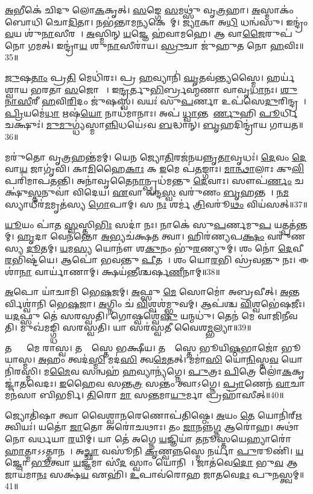 \ul{𑌅}𑌭𑍀𑌕𑍇॑ 𑌚𑌿𑌦𑍁 𑌲𑍋\ul{𑌕}𑌕𑍃𑌤𑍍।
\ul{𑌸}𑌙𑍍𑌗𑍇 \ul{𑌸}𑌮𑌥𑍍𑌸𑍁॑ 𑌵𑍃\ul{𑌤𑍍𑌰}𑌹𑌾।
\ul{𑌅}𑌸𑍍𑌮𑌾𑌕𑌂॑ 𑌬𑍋𑌧𑌿 𑌚𑍋\ul{𑌦𑌿}𑌤𑌾।
𑌨𑌭॑𑌨𑍍𑌤𑌾𑌮\ul{𑌨𑍍𑌯}𑌕𑍇𑌷𑌾᳚𑌮𑍍।
\ul{𑌜𑍍𑌯𑌾}𑌕𑌾 𑌅\ul{𑌧𑌿} 𑌧𑌨𑍍𑌵॑𑌸𑍁।
𑌇𑌨𑍍𑌦𑍍𑌰𑌂॑ \ul{𑌵}𑌯 𑌶𑍁॑\ul{𑌨𑌾}𑌸𑍀𑌰𑌮𑍍᳚।
\ul{𑌅}𑌸𑍍𑌮𑌿𑌨𑍍 \ul{𑌯}𑌜𑍍𑌞𑍇 𑌹॑𑌵𑌾𑌮𑌹𑍇।
𑌆 𑌵𑌾\ul{𑌜𑍈}𑌰𑍁𑌪॑ 𑌨𑍋 𑌗𑌮𑌤𑍍।
𑌇𑌨𑍍𑌦𑍍𑌰𑌾॑\ul{𑌯} 𑌶𑍁\ul{𑌨𑌾}𑌸𑍀𑌰𑌾॑𑌯।
\ul{𑌸𑍍𑌰𑍁}𑌚𑌾 𑌜𑍁॑𑌹𑍁𑌤 𑌨𑍋 \ul{𑌹}𑌵𑌿𑌃॥35॥

\ul{𑌜𑍁}𑌷\ul{𑌤𑌾𑌂} 𑌪𑍍𑌰\ul{𑌤𑌿} 𑌮𑍇𑌧𑌿॑𑌰𑌃।
𑌪𑍍𑌰 \ul{𑌹}𑌵𑍍𑌯𑌾𑌨𑌿॑ \ul{𑌘𑍃}𑌤𑌵॑𑌨𑍍𑌤𑍍𑌯𑌸𑍍𑌮𑍈।
𑌹𑌰𑍍𑌯॑𑌶𑍍𑌵𑌾𑌯 𑌭𑌰𑌤𑌾 \ul{𑌸}𑌜𑍋𑌷𑌾𑌃᳚।
𑌇\ul{𑌨𑍍𑌦𑍍𑌰}𑌰𑍍𑌤𑍁\ul{𑌭𑌿}𑌰𑍍𑌬𑍍𑌰𑌹𑍍𑌮॑𑌣𑌾 𑌵𑌾𑌵𑍃\ul{𑌧𑌾}𑌨𑌃।
\ul{𑌶𑍁}\ul{𑌨𑌾}\ul{𑌸𑍀}𑌰𑍀 \ul{𑌹}𑌵𑌿\ul{𑌰𑌿}𑌦𑌂 𑌜𑍁॑𑌷𑌸𑍍𑌵।
𑌵𑌯𑌃॑ 𑌸𑍁\ul{𑌪}𑌰𑍍𑌣𑌾 𑌉𑌪॑𑌸𑍇\ul{𑌦𑍁}𑌰𑌿𑌨𑍍𑌦𑍍𑌰𑌮𑍍᳚।
\ul{𑌪𑍍𑌰𑌿}𑌯𑌮𑍇॑\ul{𑌧𑌾} 𑌋𑌷॑\ul{𑌯𑍋} 𑌨𑌾𑌧॑𑌮𑌾𑌨𑌾𑌃।
𑌅𑌪॑ \ul{𑌧𑍍𑌵𑌾}𑌨𑍍𑌤𑌮𑍂᳚\ul{𑌰𑍍𑌣𑍁}𑌹𑌿 \ul{𑌪𑍂}𑌰𑍍𑌧𑌿 𑌚𑌕𑍍𑌷𑍁𑌃॑।
\ul{𑌮𑍁}\ul{𑌮𑍁}𑌗𑍍𑌧𑍍𑌯॑𑌸𑍍𑌮𑌾\ul{𑌨𑍍𑌨𑌿}𑌧𑌯𑍇॑𑌽𑌵 \ul{𑌬}𑌦𑍍𑌧𑌾𑌨𑍍।
\ul{𑌬𑍃}𑌹𑌦𑌿𑌨𑍍𑌦𑍍𑌰𑌾॑𑌯 𑌗𑌾𑌯𑌤॥36॥

𑌮𑌰𑍁॑𑌤𑍋 𑌵𑍃\ul{𑌤𑍍𑌰}𑌹𑌨𑍍𑌤॑𑌮𑌮𑍍।
𑌯𑍇\ul{𑌨} 𑌜𑍍𑌯𑍋\ul{𑌤𑌿}𑌰𑌜॑𑌨𑌯𑌨𑍍𑌨𑍃\ul{𑌤𑌾}𑌵𑍃𑌧𑌃॑।
\ul{𑌦𑍇}𑌵𑌂 \ul{𑌦𑍇}𑌵𑌾\ul{𑌯} 𑌜𑌾𑌗𑍃॑𑌵𑌿।
𑌕𑌾\ul{𑌮𑌿}𑌹𑍈\ul{𑌕𑌾𑌃} 𑌕 \ul{𑌇}𑌮𑍇 𑌪॑\ul{𑌤}𑌙𑍍𑌗𑌾𑌃।
\ul{𑌮𑌾}\ul{𑌨𑍍𑌥𑌾}𑌲𑌾𑌃 𑌕𑍁\ul{𑌲𑌿}𑌪𑌰𑌿॑𑌮𑌾𑌪𑌤𑌨𑍍𑌤𑌿।
𑌅𑌨𑌾॑𑌵𑍃𑌤𑍈\ul{𑌨𑌾}𑌨𑍍𑌪𑍍𑌰𑌧॑𑌮𑌨𑍍𑌤𑍁 \ul{𑌦𑍇}𑌵𑌾𑌃।
𑌸𑍗𑌪॑\ul{𑌰𑍍𑌣𑌂} 𑌚𑌕𑍍𑌷𑍁॑\ul{𑌸𑍍𑌤}𑌨𑍁𑌵𑌾॑ 𑌵𑌿𑌦𑍇𑌯।
\ul{𑌏}𑌵𑌾 𑌵॑𑌨𑍍𑌦\ul{𑌸𑍍𑌵} 𑌵𑌰𑍁॑𑌣𑌂 \ul{𑌬𑍃}𑌹𑌨𑍍𑌤𑌮𑍍᳚।
\ul{𑌨}\ul{𑌮}𑌸𑍍𑌯𑌾𑌧𑍀𑌰॑\ul{𑌮}𑌮𑍃𑌤॑𑌸𑍍𑌯 \ul{𑌗𑍋}𑌪𑌾𑌮𑍍।
𑌸 \ul{𑌨𑌃} 𑌶𑌰𑍍𑌮॑ \ul{𑌤𑍍𑌰𑌿}𑌵𑌰𑍂॑\ul{𑌥𑌂} 𑌵𑌿𑌯॑𑌸𑌤𑍍॥37॥

\ul{𑌯𑍂}𑌯𑌂 𑌪𑌾॑𑌤 \ul{𑌸𑍍𑌵}𑌸𑍍𑌤𑌿\ul{𑌭𑌿𑌃} 𑌸𑌦𑌾॑ 𑌨𑌃।
𑌨𑌾𑌕𑍇॑ 𑌸𑍁\ul{𑌪}𑌰𑍍𑌣𑌮𑍁\ul{𑌪} 𑌯𑌤𑍍𑌪𑌤॑𑌨𑍍𑌤𑌮𑍍।
\ul{𑌹𑍃}𑌦𑌾 𑌵𑍇𑌨॑𑌨𑍍𑌤𑍋 \ul{𑌅}𑌭𑍍𑌯𑌚॑𑌕𑍍𑌷𑌤 𑌤𑍍𑌵𑌾।
𑌹𑌿𑌰॑𑌣𑍍𑌯𑌪\ul{𑌕𑍍𑌷𑌂} 𑌵𑌰𑍁॑𑌣𑌸𑍍𑌯 \ul{𑌦𑍂}𑌤𑌮𑍍।
\ul{𑌯}𑌮\ul{𑌸𑍍𑌯} 𑌯𑍋𑌨𑍗॑ 𑌶\ul{𑌕𑍁}𑌨𑌂 𑌭𑍁॑\ul{𑌰}𑌣𑍍𑌯𑍁𑌮𑍍।
𑌶𑌂 𑌨𑍋॑ \ul{𑌦𑍇}𑌵𑍀\ul{𑌰}𑌭𑌿𑌷𑍍𑌟॑𑌯𑍇।
𑌆𑌪𑍋॑ 𑌭𑌵𑌨𑍍𑌤𑍁 \ul{𑌪𑍀}𑌤𑌯𑍇᳚।
𑌶𑌂 𑌯𑍋\ul{𑌰}𑌭𑌿 𑌸𑍍𑌰॑𑌵𑌨𑍍𑌤𑍁 𑌨𑌃।
𑌈𑌶𑌾॑\ul{𑌨𑌾} 𑌵𑌾𑌰𑍍𑌯𑌾॑𑌣𑌾𑌮𑍍।
𑌕𑍍𑌷𑌯॑𑌨𑍍𑌤𑍀𑌶𑍍𑌚𑌰𑍍\mbox{}𑌷\ul{𑌣𑍀}𑌨𑌾𑌮𑍍॥38॥

\ul{𑌅}𑌪𑍋 𑌯𑌾॑𑌚𑌾𑌮𑌿 𑌭𑍇\ul{𑌷}𑌜𑌮𑍍।
\ul{𑌅}𑌫𑍍𑌸𑍁 \ul{𑌮𑍇} 𑌸𑍋𑌮𑍋॑ 𑌅𑌬𑍍𑌰𑌵𑍀𑌤𑍍।
\ul{𑌅}𑌨𑍍𑌤𑌰𑍍𑌵𑌿𑌶𑍍𑌵𑌾॑𑌨𑌿 𑌭𑍇\ul{𑌷}𑌜𑌾।
\ul{𑌅}𑌗𑍍𑌨𑌿𑌂 𑌚॑ \ul{𑌵𑌿}𑌶𑍍𑌵𑌶॑𑌮𑍍𑌭𑍁𑌵𑌮𑍍।
𑌆𑌪॑𑌶𑍍𑌚 \ul{𑌵𑌿}𑌶𑍍𑌵𑌭𑍇॑𑌷𑌜𑍀𑌃।
𑌯\ul{𑌦}𑌫𑍍𑌸𑍁 𑌤𑍇॑ 𑌸𑌰𑌸𑍍𑌵𑌤𑌿।
𑌗𑍋𑌷𑍍𑌵𑌶𑍍𑌵𑍇॑\ul{𑌷𑍁} 𑌯𑌨𑍍𑌮𑌧𑍁॑।
𑌤𑍇𑌨॑ 𑌮𑍇 𑌵𑌾𑌜𑌿𑌨𑍀𑌵𑌤𑌿।
𑌮𑍁𑌖॑𑌮𑌙𑍍𑌗𑍍𑌧𑌿 𑌸𑌰𑌸𑍍𑌵𑌤𑌿।
𑌯𑌾 𑌸𑌰॑𑌸𑍍𑌵𑌤𑍀 𑌵𑍈𑌶\ul{𑌮𑍍𑌭}𑌲𑍍𑌯𑌾॥39॥

𑌤𑌸𑍍𑌯𑌾𑌂᳚ 𑌮𑍇 𑌰𑌾𑌸𑍍𑌵।
𑌤𑌸𑍍𑌯𑌾᳚𑌸𑍍𑌤𑍇 𑌭𑌕𑍍𑌷𑍀𑌯।
𑌤𑌸𑍍𑌯𑌾᳚𑌸𑍍𑌤𑍇 𑌭𑍂𑌯𑌿\ul{𑌷𑍍𑌠}𑌭𑌾𑌜𑍋॑ 𑌭𑍂𑌯𑌾𑌸𑍍𑌮।
\ul{𑌅}𑌹𑌂 𑌤𑍍𑌵𑌦॑\ul{𑌸𑍍𑌮𑌿} 𑌮𑌦॑\ul{𑌸𑌿} 𑌤𑍍𑌵\ul{𑌮𑍇}𑌤𑌤𑍍।
𑌮𑌮𑌾॑\ul{𑌸𑌿} 𑌯𑍋\ul{𑌨𑌿}𑌸𑍍𑌤\ul{𑌵} 𑌯𑍋𑌨𑌿॑𑌰𑌸𑍍𑌮𑌿।
𑌮\ul{𑌮𑍈}𑌵 𑌸𑌨𑍍𑌵𑌹॑ \ul{𑌹}𑌵𑍍𑌯𑌾𑌨𑍍𑌯॑𑌗𑍍𑌨𑍇।
\ul{𑌪𑍁}𑌤𑍍𑌰𑌃 \ul{𑌪𑌿}𑌤𑍍𑌰𑍇 𑌲𑍋॑\ul{𑌕}𑌕𑍃𑌜𑍍𑌜𑌾॑𑌤𑌵𑍇𑌦𑌃।
\ul{𑌇}𑌹𑍈𑌵 𑌸𑌨𑍍𑌤\ul{𑌤𑍍𑌰} 𑌸𑌨𑍍𑌤𑌂॑ 𑌤𑍍𑌵𑌾\-𑌽𑌗𑍍𑌨𑍇।
\ul{𑌪𑍍𑌰𑌾}𑌣𑍇𑌨॑ \ul{𑌵𑌾}𑌚𑌾 𑌮𑌨॑𑌸𑌾 𑌬𑌿𑌭𑌰𑍍𑌮𑌿।
\ul{𑌤𑌿}𑌰𑍋 \ul{𑌮𑌾} 𑌸\ul{𑌨𑍍𑌤}𑌮𑌾\ul{𑌯𑍁}𑌰𑍍𑌮𑌾 𑌪𑍍𑌰𑌹𑌾॑𑌸𑍀𑌤𑍍॥40॥

𑌜𑍍𑌯𑍋𑌤𑌿॑𑌷𑌾 𑌤𑍍𑌵𑌾 𑌵𑍈𑌶𑍍𑌵𑌾\ul{𑌨}𑌰𑍇𑌣𑍋𑌪॑𑌤𑌿𑌷𑍍𑌠𑍇।
\ul{𑌅}𑌯𑌂 \ul{𑌤𑍇} 𑌯𑍋𑌨𑌿॑𑌰𑍍\mbox{}\ul{𑌋}𑌤𑍍𑌵𑌿𑌯𑌃॑।
𑌯𑌤𑍋॑ \ul{𑌜𑌾}𑌤𑍋 𑌅𑌰𑍋॑𑌚𑌥𑌾𑌃।
𑌤𑌂 \ul{𑌜𑌾}𑌨𑌨𑍍𑌨॑\ul{𑌗𑍍𑌨} 𑌆𑌰𑍋॑𑌹।
𑌅𑌥𑌾॑ 𑌨𑍋 𑌵𑌰𑍍𑌧𑌯𑌾 \ul{𑌰}𑌯𑌿𑌮𑍍।
𑌯𑌾 𑌤𑍇॑ 𑌅𑌗𑍍𑌨𑍇 \ul{𑌯}𑌜𑍍𑌞𑌿𑌯𑌾॑ \ul{𑌤}𑌨𑍂𑌸𑍍𑌤𑌯𑍇𑌹𑍍𑌯𑌾𑌰𑍋॑\ul{𑌹𑌾}𑌤𑍍𑌮𑌾\-𑌽𑌽𑌤𑍍𑌮𑌾𑌨𑌮𑍍᳚।
𑌅\ul{𑌚𑍍𑌛𑌾} 𑌵𑌸𑍂॑𑌨𑌿 \ul{𑌕𑍃}𑌣𑍍𑌵\ul{𑌨𑍍𑌨}𑌸𑍍𑌮𑍇 𑌨𑌰𑍍𑌯𑌾॑ \ul{𑌪𑍁}𑌰𑍂𑌣𑌿॑।
\ul{𑌯}𑌜𑍍𑌞𑍋 \ul{𑌭𑍂}𑌤𑍍𑌵𑌾 \ul{𑌯}𑌜𑍍𑌞𑌮𑌾 𑌸𑍀॑\ul{𑌦} 𑌸𑍍𑌵𑌾𑌂 𑌯𑍋𑌨𑌿𑌮𑍍᳚।
𑌜𑌾𑌤॑𑌵𑍇\ul{𑌦𑍋} 𑌭𑍁\ul{𑌵} 𑌆 𑌜𑌾𑌯॑𑌮𑌾\ul{𑌨𑌃} 𑌸𑌕𑍍𑌷॑\ul{𑌯} 𑌏𑌹𑌿॑।
\ul{𑌉}𑌪𑌾𑌵॑𑌰𑍋𑌹 𑌜𑌾𑌤𑌵𑍇\ul{𑌦𑌃} 𑌪𑍁\ul{𑌨}𑌸𑍍𑌤𑍍𑌵𑌮𑍍॥41॥

